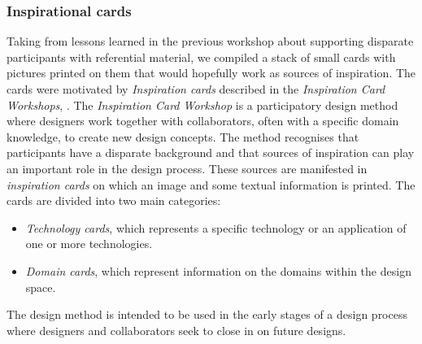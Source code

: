 \subsubsection{Inspirational cards}
\label{ch:workshops:workshop-ii:inspiration-cards}
Taking from lessons learned in the previous workshop about supporting disparate participants with referential material, we compiled a stack of small cards with pictures printed on them that would hopefully work as sources of inspiration.
The cards were motivated by \emph{Inspiration cards} described in the \emph{Inspiration Card Workshops}, \citep{halskov2006inspiration}.
The \emph{Inspiration Card Workshop} is a participatory design method where designers work together with collaborators, often with a specific domain knowledge, to create new design concepts.
The method recognises that participants have a disparate background and that sources of inspiration can play an important role in the design process.
These sources are manifested in \emph{inspiration cards} on which an image and some textual information is printed.
The cards are divided into two main categories:
\begin{itemize}
  \item{\emph{Technology cards}, which represents a specific technology or an application of one or more technologies.}
  \item{\emph{Domain cards}, which represent information on the domains within the design space.}
\end{itemize}

The design method is intended to be used in the early stages of a design process where designers and collaborators seek to close in on future designs.

